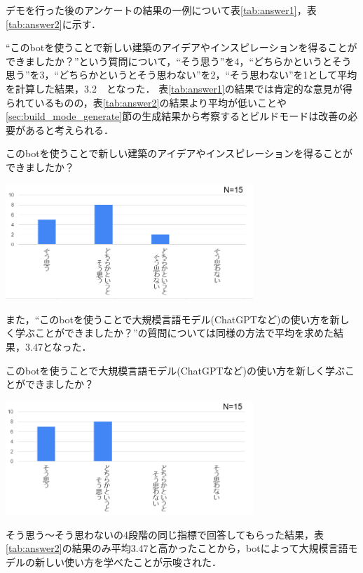 デモを行った後のアンケートの結果の一例について表\ref{tab:answer1}，表\ref{tab:answer2}に示す．

``このbotを使うことで新しい建築のアイデアやインスピレーションを得ることができましたか？''という質問について，``そう思う''を4，``どちらかというとそう思う''を3，``どちらかというとそう思わない''を2，``そう思わない''を1として平均を計算した結果，3.2　となった．
表\ref{tab:answer1}の結果では肯定的な意見が得られているものの，表\ref{tab:answer2}の結果より平均が低いことや\ref{sec:build_mode_generate}節の生成結果から考察するとビルドモードは改善の必要があると考えられる．
\begin{table}[H]
    \centering
    \caption{このbotを使うことで新しい建築のアイデアやインスピレーションを得ることができましたか？}
    \label{tab:answer1}
    \includegraphics[width=0.7\textwidth]{fig/tab2.png}
\end{table}

また，``このbotを使うことで大規模言語モデル(ChatGPTなど)の使い方を新しく学ぶことができましたか？''の質問については同様の方法で平均を求めた結果，3.47となった．

\begin{table}[H]
    \centering
    \caption{このbotを使うことで大規模言語モデル(ChatGPTなど)の使い方を新しく学ぶことができましたか？}
    \label{tab:answer2}
    \includegraphics[width=0.7\textwidth]{fig/tab3.png}
\end{table}

そう思う～そう思わないの4段階の同じ指標で回答してもらった結果，表\ref{tab:answer2}の結果のみ平均3.47と高かったことから，botによって大規模言語モデルの新しい使い方を学べたことが示唆された．




